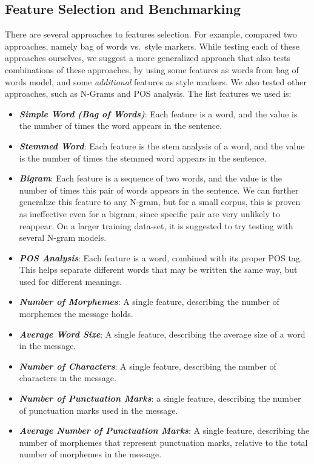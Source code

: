 \documentclass[a4paper]{article}
\begin{document}
\subsection{Feature Selection and Benchmarking}

There are several approaches to features selection. For example, \citep{rachel} compared two approaches, namely bag of words vs.\ style markers.
While testing each of these approaches ourselves, we suggest a more generalized approach that also tests combinations of these approaches, by using some features as words from bag of words model, and some \emph{additional} features as style markers.
We also tested other approaches, such as N-Grams and POS analysis. The list features we used is:
\begin{itemize}
\item \textbf{\emph{Simple Word (Bag of Words)}}: Each feature is a word, and the value is the number of times the word appears in the sentence.
\item \textbf{\emph{Stemmed Word}}: Each feature is the stem analysis of a word, and the value is the number of times the stemmed word appears in the sentence.
\item \textbf{\emph{Bigram}}: Each feature is a sequence of two words, and the value is the number of times this pair of words appears in the sentence. We can further generalize this feature to any N-gram, but for a small corpus, this is proven as ineffective even for a bigram, since specific pair are very unlikely to reappear. On a larger training data-set, it is suggested to try testing with several N-gram models.
\item \textbf{\emph{POS Analysis}}: Each feature is a word, combined with its proper POS tag. This helps separate different words that may be written the same way, but used for different meanings.
\item \textbf{\emph{Number of Morphemes}}: A single feature, describing the number of morphemes the message holds.
\item \textbf{\emph{Average Word Size}}: A single feature, describing the average size of a word in the message.
\item \textbf{\emph{Number of Characters}}: A single feature, describing the number of characters in the message.
\item \textbf{\emph{Number of Punctuation Marks}}: a single feature, describing the number of punctuation marks used in the message.
\item \textbf{\emph{Average Number of Punctuation Marks}}: A single feature, describing the number of morphemes that represent punctuation marks, relative to the total number of morphemes in the message.

\end{itemize}
\end{document}
